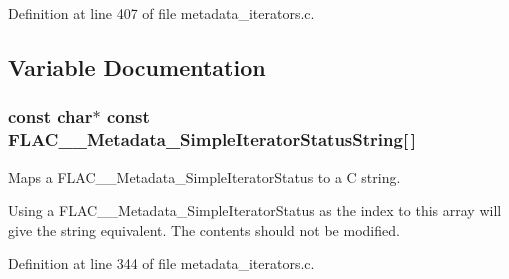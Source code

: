Definition at line 407 of file metadata\+\_\+iterators.\+c.



\subsection{Variable Documentation}
\subsubsection[{\texorpdfstring{F\+L\+A\+C\+\_\+\+\_\+\+Metadata\+\_\+\+Simple\+Iterator\+Status\+String}{FLAC__Metadata_SimpleIteratorStatusString}}]{ {\bf const} char$\ast$ {\bf const} F\+L\+A\+C\+\_\+\+\_\+\+Metadata\+\_\+\+Simple\+Iterator\+Status\+String\mbox{[}$\,$\mbox{]}}\hypertarget{group__flac__metadata__level1_ga28ea4a13fcbe97a732fafb13417036bb}{}\label{group__flac__metadata__level1_ga28ea4a13fcbe97a732fafb13417036bb}
Maps a F\+L\+A\+C\+\_\+\+\_\+\+Metadata\+\_\+\+Simple\+Iterator\+Status to a C string.

Using a F\+L\+A\+C\+\_\+\+\_\+\+Metadata\+\_\+\+Simple\+Iterator\+Status as the index to this array will give the string equivalent. The contents should not be modified. 

Definition at line 344 of file metadata\+\_\+iterators.\+c.

